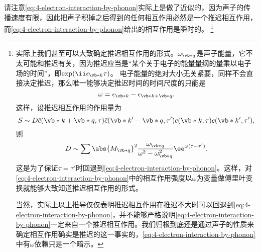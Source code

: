 请注意\eqref{eq:4-electron-interaction-by-phonon}实际上是做了近似的，因为声子的传播速度有限，因此把声子积掉之后得到的任何相互作用必然是一个推迟相互作用，而\eqref{eq:4-electron-interaction-by-phonon}给出的相互作用是瞬时的。%
\footnote{
    实际上我们甚至可以大致确定推迟相互作用的形式。$\omega_{\vb*{q}}$是声子能量，它不太可能和推迟有关，因为推迟应当是“某个关于电子的能量量纲的量乘以电子场的时间”，即$\exp(\ii \epsilon_{\vb*{k}} \tau)$。
    电子能量的绝对大小无关紧要，同样不会直接决定推迟，那么唯一能够决定推迟时间的时间尺度的只能是
    \[
        \omega = \epsilon_{\vb*{k}} - \epsilon_{\vb*{k} + \vb*{q}}.
    \]
    这样，设推迟相互作用的作用量为
    \[
        S \sim D \bar{c}(\vb*{k}+\vb*{q}, \tau) \bar{c}(\vb*{k}'-\vb*{q}, \tau') c(\vb*{k}, \tau) c(\vb*{k}', \tau'),
    \]
    则
    \[
        D \sim \sum \abs{M_{\vb*{q}}}^2 \frac{\omega_{\vb*{q}}}{\omega^2 - \omega_{\vb*{q}}^2} \ee^{\omega(\tau - \tau')}.
    \]
    这是为了保证$\tau=\tau'$时回退到\eqref{eq:4-electron-interaction-by-phonon}。这样，对\eqref{eq:4-electron-interaction-by-phonon}中的相互作用强度以$\omega$为变量做傅里叶变换就能够大致知道推迟相互作用的形式。

    当然，实际上以上推导仅仅表明推迟相互作用在推迟不大时可以回退到\eqref{eq:4-electron-interaction-by-phonon}，并不能够严格说明\eqref{eq:4-electron-interaction-by-phonon}一定来自一个推迟相互作用。我们归根到底还是通过声子的性质来确定相互作用确实是推迟的这一事实的，\eqref{eq:4-electron-interaction-by-phonon}中有$\omega$依赖只是一个暗示。
}%